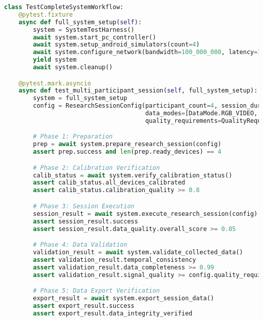 \documentclass[11pt,a4paper]{report}
\begin{document}
\begin{lstlisting}[language=Python]
class TestCompleteSystemWorkflow:
    @pytest.fixture
    async def full_system_setup(self):
        system = SystemTestHarness()
        await system.start_pc_controller()
        await system.setup_android_simulators(count=4)
        await system.configure_network(bandwidth=100_000_000, latency=10, packet_loss=0.1)
        yield system
        await system.cleanup()

    @pytest.mark.asyncio
    async def test_multi_participant_session(self, full_system_setup):
        system = full_system_setup
        config = ResearchSessionConfig(participant_count=4, session_duration=300,
                                       data_modes=[DataMode.RGB_VIDEO, DataMode.THERMAL_IMAGING, DataMode.GSR_MEASUREMENT],
                                       quality_requirements=QualityRequirements(min_frame_rate=30, max_sync_deviation=0.005, min_signal_quality=20))

        # Phase 1: Preparation
        prep = await system.prepare_research_session(config)
        assert prep.success and len(prep.ready_devices) == 4

        # Phase 2: Calibration Verification
        calib_status = await system.verify_calibration_status()
        assert calib_status.all_devices_calibrated
        assert calib_status.calibration_quality >= 0.8

        # Phase 3: Session Execution
        session_result = await system.execute_research_session(config)
        assert session_result.success
        assert session_result.data_quality.overall_score >= 0.85

        # Phase 4: Data Validation
        validation_result = await system.validate_collected_data()
        assert validation_result.temporal_consistency
        assert validation_result.data_completeness >= 0.99
        assert validation_result.signal_quality >= config.quality_requirements.min_signal_quality

        # Phase 5: Data Export Verification
        export_result = await system.export_session_data()
        assert export_result.success
        assert export_result.data_integrity_verified


\end{lstlisting}
\end{document}
